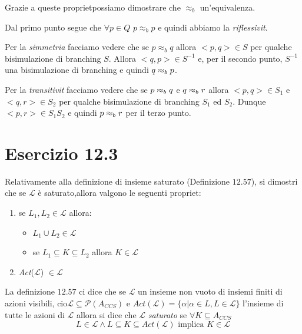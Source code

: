 		\vspace{5 mm}
		Grazie a queste propriet\aacc possiamo dimostrare che $\approx_{b}$ \eacc un'equivalenza.
		
		Dal primo punto segue che $\forall p \in Q$ $p\approx_{b}p$ e quindi abbiamo la \emph{riflessivit\aacc}.
		
		Per la \emph{simmetria} facciamo vedere che se $p\approx_{b}q$ allora $<p,q>\in S$ per qualche bisimulazione di branching $S$. Allora $<q,p>\in S^{-1}$ e, per il secondo punto, $S^{-1}$ \eacc una bisimulazione di branching e quindi $q\approx_{b} p$.
		
		Per la \emph{transitivit\aacc} facciamo vedere che se $p \approx_{b} q$ e $q \approx_{b} r$ allora $<p,q>\in S_{1}$ e $<q,r>\in S_{2}$ per qualche bisimulazione di branching $S_{1}$ ed $S_{2}$. Dunque $<p,r> \in S_{1}S_{2}$ e quindi $p\approx_{b} r$ per il terzo punto.
		
		\newpage
		
	\section{Esercizio 12.3}
		\quad Relativamente alla definizione di insieme saturato (Definizione $12.57$), si dimostri che se $\mathcal{L}$ \`e saturato,allora valgono le
		seguenti propriet\aacc :
		\begin{enumerate}
		  \item se $L_1,L_2 \in \mathcal{L}$ allora:
		  \begin{itemize}
		    \item $L_1 \cup L_2 \in \mathcal{L}$
		    \item se $L_1 \subseteq K \subseteq L_2$ allora $K \in \mathcal{L}$
		  \end{itemize}
		  \item \emph{Act}($\mathcal{L}$) $\in \mathcal{L}$
		\end{enumerate}
		
		\sectionline
		
		La definizione $12.57$ ci dice che se $\mathcal{L}$ \eacc un insieme non vuoto di insiemi finiti di azioni visibili, cio\eacc $\mathcal{L}\subseteq\mathcal{P}(A_{CCS})$ e $Act(\mathcal{L}) = \{ \alpha|\alpha\in L, L\in \mathcal{L}\}$ \eacc l'insieme di tutte le azioni di $\mathcal{L}$ allora si dice che $\mathcal{L}$ \eacc \emph{saturato} se $\forall K \subseteq A_{CCS}$ $$L\in\mathcal{L}\land L\subseteq K \subseteq Act(\mathcal{L}) \text{ implica } K \in \mathcal{L}$$
		
